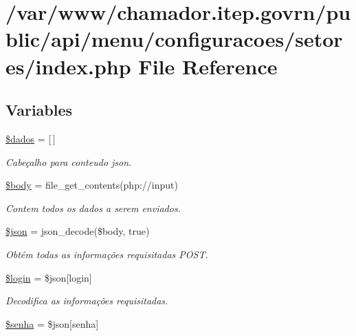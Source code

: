 \hypertarget{menu_2configuracoes_2setores_2index_8php}{}\section{/var/www/chamador.itep.\+govrn/public/api/menu/configuracoes/setores/index.php File Reference}
\label{menu_2configuracoes_2setores_2index_8php}
\subsection*{Variables}
\begin{DoxyCompactItemize}
\item 
\hyperlink{menu_2configuracoes_2setores_2index_8php_a252370d95039a38fa11afab784725d58}{\$dados} = \mbox{[}$\,$\mbox{]}
\begin{DoxyCompactList}\small\item\em Cabeçalho para conteudo json. \end{DoxyCompactList}\item 
\hyperlink{menu_2configuracoes_2setores_2index_8php_a26b9f9373f7bb79dfcf8a86dff086b45}{\$body} = file\+\_\+get\+\_\+contents(\textquotesingle{}php\+://input\textquotesingle{})
\begin{DoxyCompactList}\small\item\em Contem todos os dados a serem enviados. \end{DoxyCompactList}\item 
\hyperlink{menu_2configuracoes_2setores_2index_8php_acedd13b51401130848ce18f4d5c52605}{\$json} = json\+\_\+decode(\$body, true)
\begin{DoxyCompactList}\small\item\em Obtém todas as informações requisitadas P\+O\+ST. \end{DoxyCompactList}\item 
\hyperlink{menu_2configuracoes_2setores_2index_8php_afc31993e855f9631572adfedcfe6f34b}{\$login} = \$json\mbox{[}\textquotesingle{}login\textquotesingle{}\mbox{]}
\begin{DoxyCompactList}\small\item\em Decodifica as informações requisitadas. \end{DoxyCompactList}\item 
\hyperlink{menu_2configuracoes_2setores_2index_8php_a3678c8769c9698fd30581c1016c5f475}{\$senha} = \$json\mbox{[}\textquotesingle{}senha\textquotesingle{}\mbox{]}

\end{DoxyCompactItemize}
